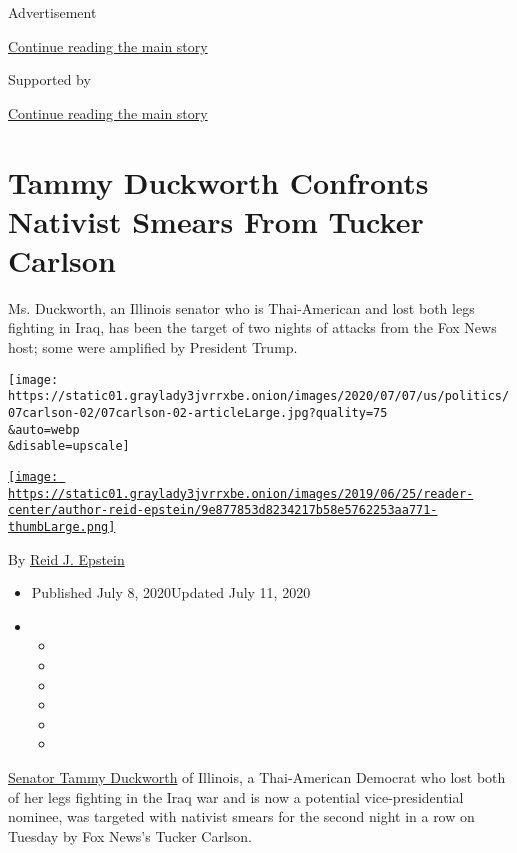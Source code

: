 Advertisement

\protect\hyperlink{after-top}{Continue reading the main story}

Supported by

\protect\hyperlink{after-sponsor}{Continue reading the main story}

\hypertarget{tammy-duckworth-confronts-nativist-smears-from-tucker-carlson}{%
\section{Tammy Duckworth Confronts Nativist Smears From Tucker
Carlson}\label{tammy-duckworth-confronts-nativist-smears-from-tucker-carlson}}

Ms. Duckworth, an Illinois senator who is Thai-American and lost both
legs fighting in Iraq, has been the target of two nights of attacks from
the Fox News host; some were amplified by President Trump.

\texttt{[image: https://static01.graylady3jvrrxbe.onion/images/2020/07/07/us/politics/07carlson-02/07carlson-02-articleLarge.jpg?quality=75\\\&auto=webp\\\&disable=upscale]}

\href{https://www.nytimes3xbfgragh.onion/by/reid-j-epstein}{\texttt{[image: https://static01.graylady3jvrrxbe.onion/images/2019/06/25/reader-center/author-reid-epstein/9e877853d8234217b58e5762253aa771-thumbLarge.png]}}

By \href{https://www.nytimes3xbfgragh.onion/by/reid-j-epstein}{Reid J.
Epstein}

\begin{itemize}
\item
  Published July 8, 2020Updated July 11, 2020
\item
  \begin{itemize}
  \item
  \item
  \item
  \item
  \item
  \item
  \end{itemize}
\end{itemize}

\href{https://www.nytimes3xbfgragh.onion/2020/06/25/us/politics/tammy-duckworth-vice-president-joe-biden.html}{Senator
Tammy Duckworth} of Illinois, a Thai-American Democrat who lost both of
her legs fighting in the Iraq war and is now a potential
vice-presidential nominee, was targeted with nativist smears for the
second night in a row on Tuesday by Fox News's Tucker Carlson.

